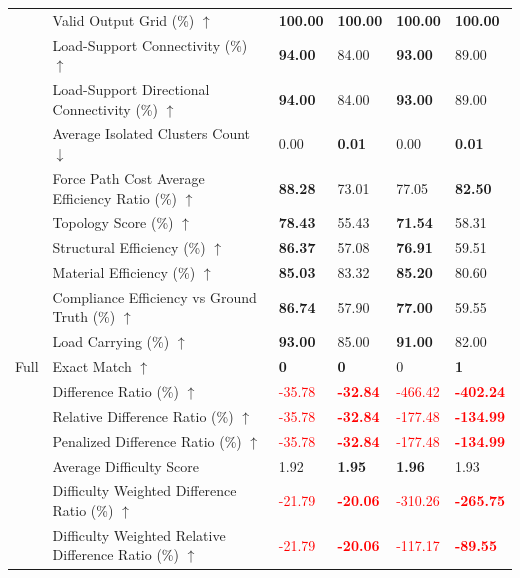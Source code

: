 \begin{table}[!h]
{\begin{tabular}{llll|ll}
 & Valid Output Grid (\%) $\uparrow$ & \textbf{100.00} & \textbf{100.00} & \textbf{100.00} & \textbf{100.00} \\
 & Load-Support Connectivity (\%) $\uparrow$ & \textbf{94.00} & 84.00 & \textbf{93.00} & 89.00 \\
 & Load-Support Directional Connectivity (\%) $\uparrow$ & \textbf{94.00} & 84.00 & \textbf{93.00} & 89.00 \\
 & Average Isolated Clusters Count $\downarrow$ & 0.00 & \textbf{0.01} & 0.00 & \textbf{0.01} \\
 & Force Path Cost Average Efficiency Ratio (\%) $\uparrow$ & \textbf{88.28} & 73.01 & 77.05 & \textbf{82.50} \\
 & Topology Score (\%) $\uparrow$ & \textbf{78.43} & 55.43 & \textbf{71.54} & 58.31 \\
 & Structural Efficiency (\%) $\uparrow$ & \textbf{86.37} & 57.08 & \textbf{76.91} & 59.51 \\
 & Material Efficiency (\%) $\uparrow$ & \textbf{85.03} & 83.32 & \textbf{85.20} & 80.60 \\
 & Compliance Efficiency vs Ground Truth (\%) $\uparrow$ & \textbf{86.74} & 57.90 & \textbf{77.00} & 59.55 \\
 & Load Carrying (\%) $\uparrow$ & \textbf{93.00} & 85.00 & \textbf{91.00} & 82.00 \\
\midrule
Full & Exact Match $\uparrow$ & \textbf{0} & \textbf{0} & 0 & \textbf{1} \\
 & Difference Ratio (\%) $\uparrow$ & \textcolor{red}{-35.78} & \textbf{\textcolor{red}{-32.84}} & \textcolor{red}{-466.42} & \textbf{\textcolor{red}{-402.24}} \\
 & Relative Difference Ratio (\%) $\uparrow$ & \textcolor{red}{-35.78} & \textbf{\textcolor{red}{-32.84}} & \textcolor{red}{-177.48} & \textbf{\textcolor{red}{-134.99}} \\
 & Penalized Difference Ratio (\%) $\uparrow$ & \textcolor{red}{-35.78} & \textbf{\textcolor{red}{-32.84}} & \textcolor{red}{-177.48} & \textbf{\textcolor{red}{-134.99}} \\
 & Average Difficulty Score & 1.92 & \textbf{1.95} & \textbf{1.96} & 1.93 \\
 & Difficulty Weighted Difference Ratio (\%) $\uparrow$ & \textcolor{red}{-21.79} & \textbf{\textcolor{red}{-20.06}} & \textcolor{red}{-310.26} & \textbf{\textcolor{red}{-265.75}} \\
 & Difficulty Weighted Relative Difference Ratio (\%) $\uparrow$ & \textcolor{red}{-21.79} & \textbf{\textcolor{red}{-20.06}} & \textcolor{red}{-117.17} & \textbf{\textcolor{red}{-89.55}} \\

\end{tabular}}
\end{table}

